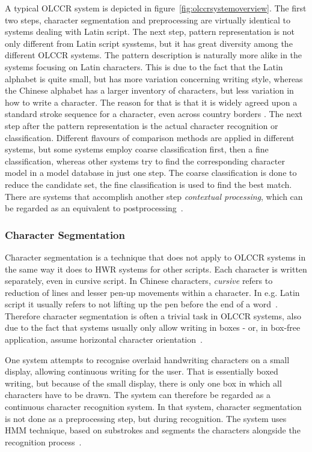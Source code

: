 A typical OLCCR system is depicted in figure~\ref{fig:olccrsystemoverview}.
The first two steps, character segmentation and preprocessing are virtually
identical to systems dealing with Latin script. The next step, pattern 
representation is not only different from Latin script sysstems, but it has
great diversity among the different OLCCR systems.
The pattern description is naturally more alike in the systems focusing on 
Latin characters. This is due to the fact that the Latin alphabet is quite 
small, but has more variation concerning writing style, whereas the Chinese 
alphabet has a larger inventory of characters, but less variation in how to 
write a character. The reason for that is that it is widely agreed upon a 
standard stroke sequence for a character, even across country 
borders .
The next step after the pattern representation is the actual character 
recognition or classification. Different flavours of comparison methods are
applied in different systems, but some systems employ coarse classification 
first, then a fine classification, whereas other systems try to find the 
corresponding character model in a model database in just one step.
The coarse classification is done to reduce the candidate set, the fine 
classification is used to find the best match. There are systems that 
accomplish another step \emph{contextual processing}, which can be regarded 
as an equivalent to postprocessing~.

\subsubsection{Character Segmentation}
\label{sec:olccrcharactersegmentation}

Character segmentation is a technique that does not apply to OLCCR systems in
the same way it does to HWR systems for other scripts. Each character is
written separately, even in cursive script. In Chinese characters, \emph{cursive}
refers to reduction of lines and lesser pen-up movements within a character.
In e.g. Latin script it usually refers to not lifting up the pen before the end
of a word~. Therefore character segmentation is often a
trivial task in OLCCR systems, also due to the fact that systems usually only
allow writing in boxes - or, in box-free application, assume horizontal 
character orientation~.

One system attempts to recognise overlaid handwriting characters on a small 
display, allowing continuous writing for the user. That is essentially boxed
writing, but because of the small display, there is only one box in which 
all characters have to be drawn. The system can therefore be regarded as a
continuous character recognition system. In that system, character segmentation 
is not done as a preprocessing step, but during recognition. The system uses 
HMM technique, based on substrokes and segments the characters alongside the 
recognition process~.

